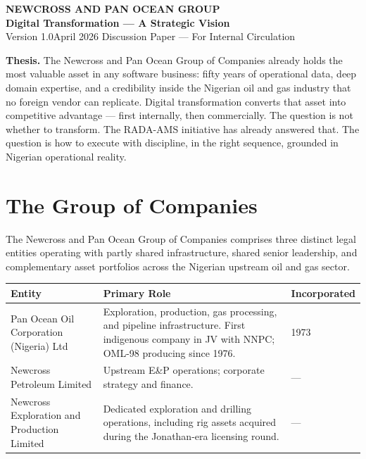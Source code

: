 \documentclass[10pt]{article}
\begin{document}
\begin{center}
  \vspace*{0.15cm}
  {\color{primary}\LARGE\bfseries NEWCROSS AND PAN OCEAN GROUP}\\[5pt]
  {\color{primary}\large\bfseries Digital Transformation --- A Strategic Vision}\\[10pt]
  {\color{darkgrey}\normalsize Version 1.0\quad\textbar\quad April 2026\quad\textbar\quad
   Discussion Paper --- For Internal Circulation}
\end{center}

\noindent\colorbox{primary!8}{%
\begin{minipage}{\dimexpr\textwidth-2\fboxsep}
  \vspace{5pt}
  \textbf{\color{primary}Thesis.}\quad
  The Newcross and Pan Ocean Group of Companies already holds the most valuable
  asset in any software business: fifty years of operational data, deep domain expertise,
  and a credibility inside the Nigerian oil and gas industry that no foreign vendor can
  replicate. Digital transformation converts that asset into competitive advantage ---
  first internally, then commercially. The question is not whether to transform.
  The RADA-AMS initiative has already answered that. The question is how to execute
  with discipline, in the right sequence, grounded in Nigerian operational reality.
  \vspace{5pt}
\end{minipage}}

\vspace{10pt}

\section{The Group of Companies}

The Newcross and Pan Ocean Group of Companies comprises three distinct legal entities
operating with partly shared infrastructure, shared senior leadership, and
complementary asset portfolios across the Nigerian upstream oil and gas sector.

\vspace{4pt}
\small
\begin{tabularx}{\columnwidth}{@{}lXl@{}}
\toprule
\textbf{Entity} & \textbf{Primary Role} & \textbf{Incorporated} \\
\midrule
Pan Ocean Oil Corporation (Nigeria) Ltd
  & Exploration, production, gas processing, and pipeline infrastructure.
    First indigenous company in JV with NNPC; OML-98 producing since 1976.
  & 1973 \\[4pt]
Newcross Petroleum Limited
  & Upstream E\&P operations; corporate strategy and finance.
  & --- \\[4pt]
Newcross Exploration and Production Limited
  & Dedicated exploration and drilling operations, including rig assets
    acquired during the Jonathan-era licensing round.
  & --- \\
\bottomrule
\end{tabularx}
\normalsize
\end{document}
